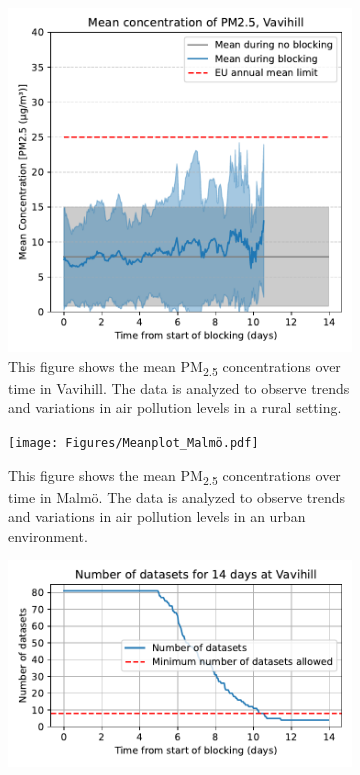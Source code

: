 \begin{figure}[H]
    \centering
    \begin{subfigure}[b]{0.49\textwidth}
        \centering
        \includegraphics[width=\textwidth]{Figures/Meanplot_Vavihill.pdf}
        \caption{This figure shows the mean PM\textsubscript{2.5} concentrations over time in Vavihill. The data is analyzed to observe trends and variations in air pollution levels in a rural setting.}
        \label{fig:Meanplot_Vavihill}
    \end{subfigure}
    \hfill
    \begin{subfigure}[b]{0.49\textwidth}
        \centering
        \texttt{[image: Figures/Meanplot\_Malmö.pdf]}
        \caption{This figure shows the mean PM\textsubscript{2.5} concentrations over time in Malmö. The data is analyzed to observe trends and variations in air pollution levels in an urban environment.}
        \label{fig:Meanplot_Malmö}
    \end{subfigure}
    \begin{subfigure}[b]{0.49\textwidth}
        \centering
        \includegraphics[width=\textwidth]{Figures/Meanplotinfo_Vavihill.pdf}

\end{subfigure}
\end{figure}
